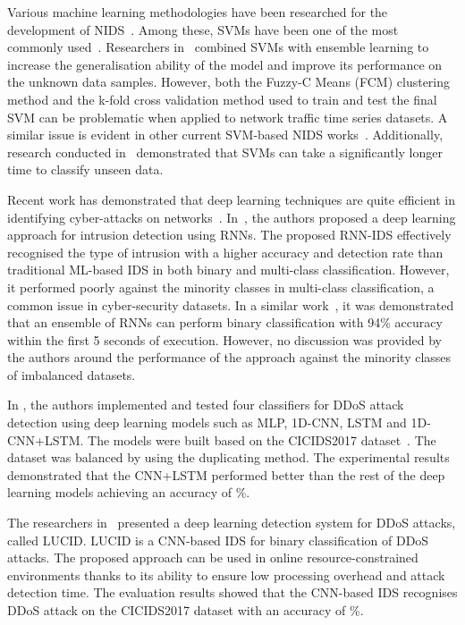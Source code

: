 \documentclass[runningheads]{llncs}
\begin{document}
Various machine learning methodologies have been researched for the development of \ac{NIDS}~\cite{ASHFAQ2017484,GUO2016391,KIM20141690}. Among these, \acp{SVM} have been one of the most commonly used~\cite{CHITRAKAR2014231,GU2021102158,GU201953}. Researchers in~\cite{CHITRAKAR2014231} combined \acp{SVM} with ensemble learning to increase the generalisation ability of the model and improve its performance on the unknown data samples. However, both the Fuzzy-C Means (FCM) clustering method and the k-fold cross validation method used to train and test the final \ac{SVM} can be problematic when applied to network traffic time series datasets. A similar issue is evident in other current \ac{SVM}-based \ac{NIDS} works~\cite{GU2021102158}. Additionally, research conducted in~\cite{AnthiEirini} demonstrated that \acp{SVM} can take a significantly longer time to classify unseen data.

Recent work has demonstrated that deep learning techniques are quite efficient in identifying cyber-attacks on networks~\cite{Singlaan}. In~\cite{Yin}, the authors proposed a deep learning approach for intrusion detection using \acp{RNN}. The proposed \ac{RNN}-\ac{IDS} effectively recognised the type of intrusion with a higher accuracy and detection rate than traditional ML-based \ac{IDS} in both binary and multi-class classification. However, it performed poorly against the minority classes in multi-class classification, a common issue in cyber-security datasets. In a similar work~\cite{RHODE2018578}, it was demonstrated that an ensemble of \acp{RNN} can perform binary classification with 94\% accuracy within the first 5 seconds of execution. However, no discussion was provided by the authors around the performance of the approach against the minority classes of imbalanced datasets. 

In \cite{1D-CNN-LSTM}, the authors implemented and tested four classifiers for \ac{DDoS} attack detection using deep learning models such as MLP, 1D-\ac{CNN}, LSTM and 1D-\ac{CNN}+LSTM. The models were built based on the CICIDS2017 dataset~\cite{Sharafaldin}. The dataset was balanced by using the duplicating method. The experimental results demonstrated that the \ac{CNN}+LSTM performed better than the rest of the deep learning models achieving an accuracy of \%.

The researchers in~\cite{LUCID} presented a deep learning detection system for \ac{DDoS} attacks, called LUCID. LUCID is a \ac{CNN}-based \ac{IDS} for binary classification of \ac{DDoS} attacks. The proposed approach can be used in online resource-constrained environments thanks to its ability to ensure low processing overhead and attack detection time. The evaluation results showed that the \ac{CNN}-based \ac{IDS} recognises \ac{DDoS} attack on the CICIDS2017 dataset with an accuracy of \%.
\end{document}
